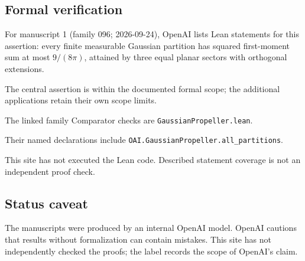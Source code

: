 \documentclass[11pt]{article}
\begin{document}
\subsection{Formal verification}
For manuscript 1 (family 096; 2026-09-24), OpenAI lists Lean statements for this assertion: every finite measurable Gaussian partition has squared first-moment sum at most $9/(8\pi)$, attained by three equal planar sectors with orthogonal extensions.

The central assertion is within the documented formal scope; the additional applications retain their own scope limits.

The linked family Comparator checks are \texttt{GaussianPropeller.lean}.

Their named declarations include \texttt{OAI.GaussianPropeller.all\_partitions}.

This site has not executed the Lean code. Described statement coverage is not an independent proof check.

\subsection{Status caveat}
The manuscripts were produced by an internal OpenAI model. OpenAI cautions that results without formalization can contain mistakes. This site has not independently checked the proofs; the label records the scope of OpenAI's claim.
\end{document}

